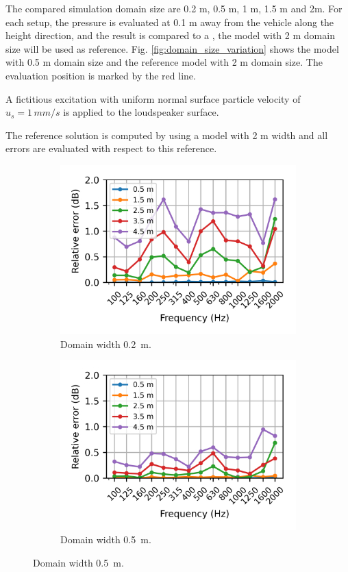 The compared simulation domain size are 0.2 m, 0.5 m, 1 m, 1.5 m and 2m. For each setup, the pressure is evaluated at 0.1 m away from the vehicle along the height direction, and the result is compared to a , the model with 2 m domain size will be used as reference. Fig. \ref{fig:domain_size_variation} shows the model with 0.5 m domain size and the reference model with 2 m domain size. The evaluation position is marked by the red line.

A fictitious excitation with uniform normal surface particle velocity of $u_s = 1\,mm/s$ is applied to the loudspeaker surface.

The reference solution is computed by using a model with 2 m width and all errors are evaluated with respect to this reference.

\begin{figure}
	\centering
	\begin{subfigure}[b]{0.48\textwidth}
		\centering
		\includegraphics{fig/chap4/simulation_domain/width_0pt2m.png}
		\caption{Domain width \SI{0.2}{\meter}.}
	\end{subfigure}
	\hfill
	\begin{subfigure}[b]{0.48\textwidth}
		\centering
		\includegraphics{fig/chap4/simulation_domain/width_0pt5m.png}
		\caption{Domain width \SI{0.5}{\meter}.}
	\end{subfigure}


\end{figure}
